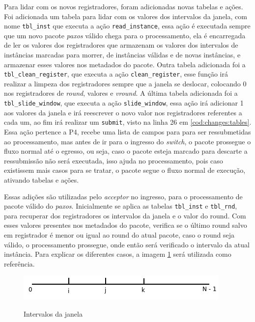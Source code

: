 \documentclass[
    12pt,
    openright, 
    oneside,
    a4paper,
    french,
    english,
    brazil
    ]{facom-ufu-abntex2}
\theoremstyle{definition}
\begin{document}


Para lidar com os novos registradores, foram adicionadas novas tabelas e ações. Foi adicionada um tabela para lidar com os
valores dos intervalos da janela, com nome \texttt{tbl\_inst} que executa a ação \texttt{read\_instance}, essa ação é executada
sempre que um novo pacote \emph{paxos} válido chega para o processamento, ela é encarregada de ler os valores dos registradores
que armazenam os valores dos intervalos de instâncias marcadas para morrer, de instâncias válidas e de novas instâncias, 
e armazenar esses valores nos metadados do pacote. Outra tabela adicionada foi a \texttt{tbl\_clean\_register}, que executa
a ação \texttt{clean\_register}, esse função irá realizar a limpeza dos registradores sempre que a janela se deslocar, colocando
0 nos registradores de \emph{round}, valores e \emph{vround}. A última tabela adicionada foi a \texttt{tbl\_slide\_window}, que executa a
ação \texttt{slide\_window}, essa ação irá adicionar 1 aos valores da janela e irá reescrever o novo valor nos registradores referentes
a cada um, ao fim irá realizar um \texttt{submit}, visto na linha 26 em \ref{cod:changes:tables}. Essa ação pertence a P4, recebe uma
lista de campos para para ser ressubmetidas ao processamento, mas antes de ir para o ingresso do \emph{switch}, o pacote prossegue o
fluxo normal até o egresso, ou seja, caso o pacote esteja marcado para descarte a ressubmissão não será executada, isso ajuda
no processamento, pois caso existissem mais casos para se tratar, o pacote segue o fluxo normal de execução, ativando
tabelas e ações.

Essas adições são utilizadas pelo \emph{acceptor} no ingresso, para o processamento de pacote válido do \emph{paxos}. Inicialmente se
aplica as tabelas \texttt{tbl\_inst} e \texttt{tbl\_rnd}, para recuperar dos registradores os intervalos da janela e o valor 
do round. Com esses valores presentes nos metadados do pacote, verifica se o último round salvo em registrador é menor
ou igual ao round do atual pacote, caso o round seja válido, o processamento prossegue, onde então será verificado o intervalo
da atual instância. Para explicar os diferentes casos, a imagem \ref{fig:window-intervals} será utilizada como referência.

\begin{figure}[ht]
    \caption{Intervalos da janela}
    \centering
    \includegraphics[scale=0.8]{images/windowOk.png}
    \label{fig:window-intervals}
\end{figure}
\end{document}
